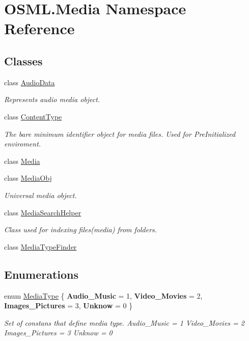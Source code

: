 \hypertarget{namespaceOSML_1_1Media}{}\section{O\+S\+M\+L.\+Media Namespace Reference}
\label{namespaceOSML_1_1Media}
\subsection*{Classes}
\begin{DoxyCompactItemize}
\item 
class \mbox{\hyperlink{classOSML_1_1Media_1_1AudioData}{Audio\+Data}}
\begin{DoxyCompactList}\small\item\em Represents audio media object. \end{DoxyCompactList}\item 
class \mbox{\hyperlink{classOSML_1_1Media_1_1ContentType}{Content\+Type}}
\begin{DoxyCompactList}\small\item\em The bare minimum identifier object for media files. Used for Pre\+Initialized enviroment. \end{DoxyCompactList}\item 
class \mbox{\hyperlink{classOSML_1_1Media_1_1Media}{Media}}
\item 
class \mbox{\hyperlink{classOSML_1_1Media_1_1MediaObj}{Media\+Obj}}
\begin{DoxyCompactList}\small\item\em Universal media object. \end{DoxyCompactList}\item 
class \mbox{\hyperlink{classOSML_1_1Media_1_1MediaSearchHelper}{Media\+Search\+Helper}}
\begin{DoxyCompactList}\small\item\em Class used for indexing files(media) from folders. \end{DoxyCompactList}\item 
class \mbox{\hyperlink{classOSML_1_1Media_1_1MediaTypeFinder}{Media\+Type\+Finder}}
\end{DoxyCompactItemize}
\subsection*{Enumerations}
\begin{DoxyCompactItemize}
\item 
enum \mbox{\hyperlink{namespaceOSML_1_1Media_aa3e4261aa5181fcc93920ffe409e8b02}{Media\+Type}} \{ {\bfseries Audio\+\_\+\+Music} = 1, 
{\bfseries Video\+\_\+\+Movies} = 2, 
{\bfseries Images\+\_\+\+Pictures} = 3, 
{\bfseries Unknow} = 0
 \}
\begin{DoxyCompactList}\small\item\em Set of constans that define media type. Audio\+\_\+\+Music = 1 Video\+\_\+\+Movies = 2 Images\+\_\+\+Pictures = 3 Unknow = 0 \end{DoxyCompactList}\end{DoxyCompactItemize}


